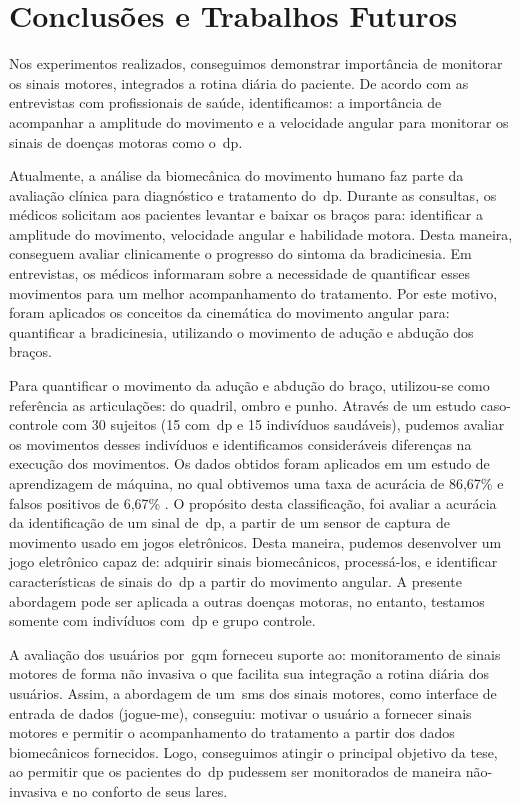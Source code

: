 \chapter{Conclusões e Trabalhos Futuros}\label{chapter:conclusoes_futuros}
Nos experimentos realizados, conseguimos demonstrar importância de monitorar os sinais motores, integrados a rotina diária do paciente. De acordo com as entrevistas com profissionais de saúde, identificamos: a importância de acompanhar a amplitude do movimento e a velocidade angular para monitorar os sinais de doenças motoras como o~\ac{dp}.

Atualmente, a análise da biomecânica do movimento humano faz parte da avaliação clínica para diagnóstico e tratamento do~\ac{dp}. Durante as consultas, os médicos solicitam aos pacientes levantar e baixar os braços para: identificar a amplitude do movimento, velocidade angular e habilidade motora. Desta maneira, conseguem avaliar clinicamente o progresso do sintoma da bradicinesia. Em entrevistas, os médicos informaram sobre a necessidade de quantificar esses movimentos para um melhor acompanhamento do tratamento. Por este motivo, foram aplicados os conceitos da cinemática do movimento angular para: quantificar a bradicinesia, utilizando o movimento de adução e abdução dos braços.

Para quantificar o movimento da adução e abdução do braço, utilizou-se como referência as articulações: do quadril, ombro e punho. Através de um estudo caso-controle com 30 sujeitos (15 com~\ac{dp} e 15 indivíduos saudáveis), pudemos avaliar os movimentos desses indivíduos e identificamos consideráveis diferenças na execução dos movimentos. Os dados obtidos foram aplicados em um estudo de aprendizagem de máquina, no qual obtivemos uma taxa de acurácia de 86,67\% e falsos positivos de 6,67\% . O propósito desta classificação, foi avaliar a acurácia da identificação de um sinal de~\ac{dp}, a partir de um sensor de captura de movimento usado em jogos eletrônicos. Desta maneira, pudemos desenvolver um jogo eletrônico  capaz de: adquirir sinais biomecânicos, processá-los, e identificar características de sinais do~\ac{dp} a partir do movimento angular. A presente abordagem pode ser aplicada a outras doenças motoras, no entanto, testamos somente com indivíduos com~\ac{dp} e grupo controle.

A avaliação dos usuários por~\ac{gqm} forneceu suporte ao: monitoramento de sinais motores de forma não invasiva o que facilita sua integração a rotina diária dos usuários. Assim, a abordagem de um~\ac{sms} dos sinais motores, como interface de entrada de dados (\ac{jogue-me}), conseguiu: motivar o usuário  a fornecer sinais motores e permitir o acompanhamento do tratamento a partir dos dados biomecânicos fornecidos. Logo, conseguimos atingir o principal objetivo da tese, ao permitir que os pacientes do~\ac{dp} pudessem ser monitorados de maneira não-invasiva e no conforto de seus lares.

